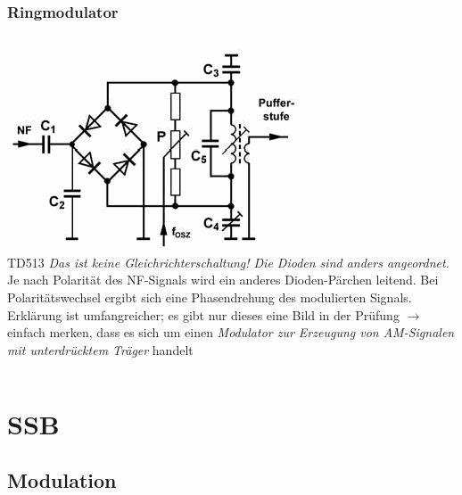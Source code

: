 \begin{frame}
  \frametitle{Ringmodulator}
  \begin{columns}
    \includegraphics[width=\textwidth,height=.8\textheight,keepaspectratio]{a12/td513.png}\\
    {\tiny TD513}
    \emph{Das ist keine Gleichrichterschaltung! Die Dioden sind anders angeordnet.}\\[1.5em]
    Je nach Polarität des NF-Signals wird ein anderes Dioden-Pärchen leitend. Bei Polaritätswechsel ergibt sich eine Phasendrehung des modulierten Signals.\\[2.5em]
    {\small Erklärung ist umfangreicher; es gibt nur dieses eine Bild in der Prüfung $\rightarrow$ einfach merken, dass es sich um einen \emph{Modulator zur Erzeugung von AM-Signalen mit unterdrücktem Träger} handelt}
  \end{columns}

\end{frame}


\section{SSB}

\subsection{Modulation}

